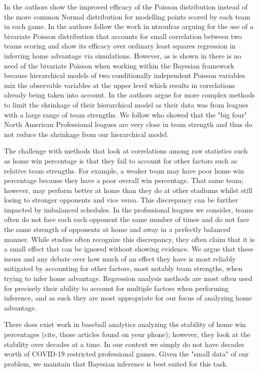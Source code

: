 In \cite{Lopez2018} the authors show the improved efficacy of the Poisson distribution instead of the more common Normal distribution \cite{GlickmanText2017} for modelling points scored by each team in each game. In \cite{Benz2020} the authors follow the work in ntzoufras arguing for the use of a bivariate Poisson distribution that accounts for small correlation between two teams scoring and show its efficacy over ordinary least squares regression in inferring home advantage via simulations. However, as is shown in \cite{Baio2010} there is no need of the bivariate Poisson when working within the Bayesian framework because hierarchical models of two conditionally independent Poisson variables mix the observable variables at the upper level which results in correlations already being taken into account. In \cite{Baio2010} the authors argue for more complex methods to limit the shrinkage of their hierarchical model as their data was from leagues with a large range of team strengths. We follow \cite{Lopez2018} who showed that the "big four" North American Professional leagues are very close in team strength and thus do not reduce the shrinkage from our hierarchical model.

The challenge with methods that look at correlations among raw statistics such as home win percentage is that they fail to account for other factors such as relative team strengths. For example, a weaker team may have poor home win percentage because they have a poor overall win percentage. That same team; however, may perform better at home than they do at other stadiums whilst still losing to stronger opponents and vice versa. This discrepancy can be further impacted by imbalanced schedules. In the professional leagues we consider, teams often do not face each each opponent the same number of times and do not face the same strength of opponents at home and away in a perfectly balanced manner. While studies often recognize this discrepancy, they often claim that it is a small effect that can be ignored \cite{Pollard2005a} without showing evidence. We argue that these issues and any debate over how much of an effect they have is most reliably mitigated by accounting for other factors, most notably team strengths, when trying to infer home advantage. Regression analysis methods are most often used for precisely their ability to account for multiple factors when performing inference, and as such they are most appropriate for our focus of analyzing home advantage.

There does exist work in baseball analytics analyzing the stability of home win percentages (cite, those articles found on your phone); however, they look at the stability over decades at a time. In our context we simply do not have decades worth of COVID-19 restricted professional games. Given the "small data" of our problem, we maintain that Bayesian inference is best suited for this task.

